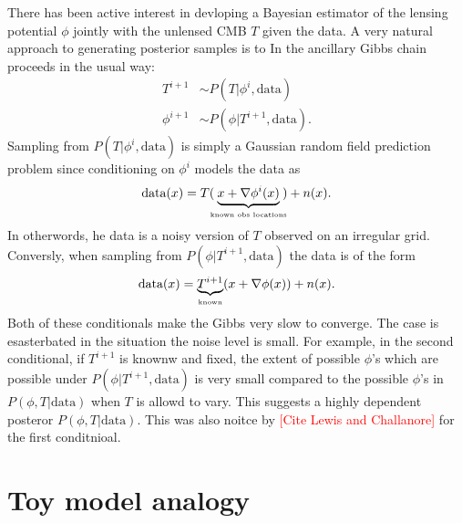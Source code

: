\documentclass[noinfoline]{imsart}
\begin{document}
There has been active interest in devloping a Bayesian estimator of the lensing potential $\phi$ jointly with the unlensed CMB $T$ given the data. A very natural approach to generating posterior samples is to 
In the ancillary Gibbs chain proceeds in the usual way:
\begin{align}
T^{i+1}&\sim P(T |  \phi^{i},\text{data})\\
\phi^{i+1}&\sim P(\phi | T^{i+1},  \text{data}).
\end{align}
Sampling from $P(T |  \phi^{i},\text{data})$ is simply a Gaussian random field prediction problem since conditioning on $\phi^i$ models the data as
\[ \text{data}(x) = T(\!\!\underbrace{x+\nabla\phi^i(x)}_\text{\tiny known obs locations}\!\!) + n(x).\]
In otherwords, he data is a noisy version of  $T$ observed on an irregular grid. 
Conversly, when sampling from $P(\phi |  T^{i+1},\text{data})$ the data is of the form
\[ \text{data}(x) = \underbrace{T^{i+1}}_{\text{\tiny known}}(x+\nabla\phi(x)) + n(x). \]
Both of these conditionals make the Gibbs very slow to converge. The case is esasterbated in the situation the noise level is small. For example, in the second conditional, if $T^{i+1}$ is knownw and fixed, the extent of possible  $\phi$'s which are possible under $P(\phi|T^{i+1},\text{data})$  is very small compared to the possible $\phi$'s  in $P(\phi, T| \text{data})$ when $T$ is allowd to vary. 
This suggests a highly dependent posteror $P(\phi, T| \text{data})$. 
This was also noitce by \textcolor{red}{[Cite Lewis and Challanore]} for the first conditnioal.

%
%
\section{Toy model analogy}
\label{two parameter system}
\end{document}
